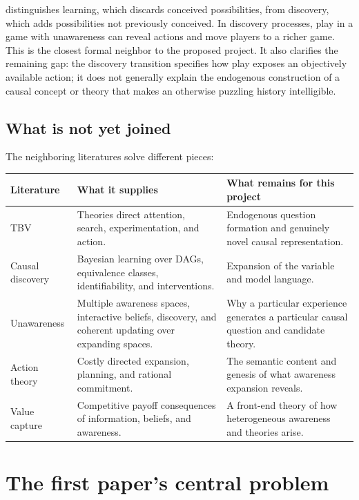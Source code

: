 \documentclass[11pt]{article}
\begin{document}
	\citet{Schipper2021} distinguishes learning, which discards conceived possibilities, from discovery, which adds possibilities not previously conceived.  In discovery processes, play in a game with unawareness can reveal actions and move players to a richer game.  This is the closest formal neighbor to the proposed project.  It also clarifies the remaining gap: the discovery transition specifies how play exposes an objectively available action; it does not generally explain the endogenous construction of a causal concept or theory that makes an otherwise puzzling history intelligible.
	
	\subsection{What is not yet joined}
	
	The neighboring literatures solve different pieces:
	
	\begin{center}
		\small
		\begin{tabularx}{\textwidth}{@{}p{}X X@{}}
			\toprule
			\textbf{Literature} & \textbf{What it supplies} & \textbf{What remains for this project} \\
			\midrule
			TBV & Theories direct attention, search, experimentation, and action. & Endogenous question formation and genuinely novel causal representation. \\
			Causal discovery & Bayesian learning over DAGs, equivalence classes, identifiability, and interventions. & Expansion of the variable and model language. \\
			Unawareness & Multiple awareness spaces, interactive beliefs, discovery, and coherent updating over expanding spaces. & Why a particular experience generates a particular causal question and candidate theory. \\
			Action theory & Costly directed expansion, planning, and rational commitment. & The semantic content and genesis of what awareness expansion reveals. \\
			Value capture & Competitive payoff consequences of information, beliefs, and awareness. & A front-end theory of how heterogeneous awareness and theories arise. \\
			\bottomrule
		\end{tabularx}
	\end{center}
	
	\section{The first paper's central problem}
	
\end{document}
